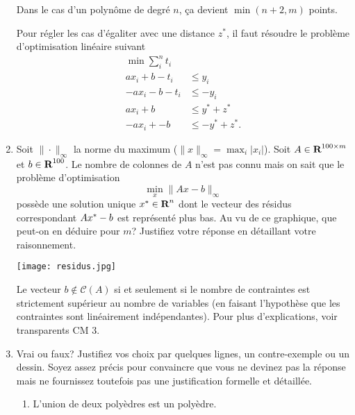 \begin{enumerate}
\begin{solution}
      Dans le cas d'un polynôme de degré $n$,
      ça devient $\min(n+2,m)$ points.

      Pour régler les cas d'égaliter avec une distance $z^*$,
      il faut résoudre le problème d'optimisation linéaire suivant
      \begin{align*}
        \min \sum_i^n t_i\\
        ax_i + b - t_i & \leq y_i\\
        -ax_i - b - t_i & \leq -y_i\\
        ax_i + b & \leq y^* + z^*\\
        -ax_i + -b & \leq -y^* + z^*.
      \end{align*}
    \end{solution}

  \item  Soit $\| \cdot \|_{\infty}$ la norme du maximum ($\| x \|_{\infty}=\max_i |x_i|$).
    Soit $A \in {\mbox{\bf R}}^{100 \times m}$  et
    $b
    \in
    {\mbox{\bf R}}^{100}$. Le nombre de colonnes de $A$ n'est pas connu mais on sait que le problème
    d'optimisation
    $$\min_{x} \|Ax-b\|_{\infty}$$
    possède une solution unique  $x^* \in {\mbox{\bf R}}^n$ dont  le
    vecteur des résidus correspondant $Ax^*-b$ est représenté plus bas. Au vu de ce graphique, que peut-on en
    déduire pour
    $m$? Justifiez votre réponse en détaillant votre raisonnement.

    \begin{center}
      \texttt{[image: residus.jpg]}
    \end{center}

    \begin{solution}
      Le vecteur $b \notin \mathcal{C}(A) $ si et seulement si le nombre de
      contraintes est strictement supérieur au nombre de variables
      (en faisant l'hypothèse que les contraintes
      sont linéairement indépendantes).
      Pour plus d'explications, voir transparents CM 3.
    \end{solution}

  \item Vrai ou faux? Justifiez vos choix par quelques lignes, un contre-exemple ou un dessin. Soyez assez précis pour convaincre
    que vous ne devinez pas la réponse mais ne fournissez toutefois pas une justification formelle et détaillée.

    \begin{enumerate}


      \item L'union de deux polyèdres est un polyèdre.


\end{enumerate}
\end{enumerate}
